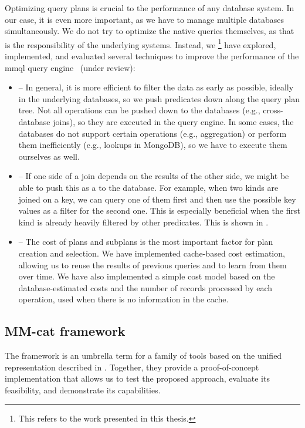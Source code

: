 Optimizing query plans is crucial to the performance of any database system. In our case, it is even more important, as we have to manage multiple databases simultaneously. We do not try to optimize the native queries themselves, as that is the responsibility of the underlying systems. Instead, we%
\footnote{This  refers to the work presented in this thesis.}
have explored, implemented, and evaluated several techniques to improve the performance of the \acrshort{mmql} query engine~\citep{strobl_2026} (under review):
\begin{itemize}
    \item {} -- In general, it is more efficient to filter the data as early as possible, ideally in the underlying databases, so we push predicates down along the query plan tree. Not all operations can be pushed down to the databases (e.g., cross-database joins), so they are executed in the query engine. In some cases, the databases do not support certain operations (e.g., aggregation) or perform them inefficiently (e.g., lookups in MongoDB), so we have to execute them ourselves as well.
    \item {} -- If one side of a join depends on the results of the other side, we might be able to push this as a  to the database. For example, when two kinds are joined on a key, we can query one of them first and then use the possible key values as a filter for the second one. This is especially beneficial when the first kind is already heavily filtered by other predicates. This is shown in .
    \item {} -- The cost of plans and subplans is the most important factor for plan creation and selection. We have implemented cache-based cost estimation, allowing us to reuse the results of previous queries and to learn from them over time. We have also implemented a simple cost model based on the database-estimated costs and the number of records processed by each operation, used when there is no information in the cache.
\end{itemize}

\subsection{MM-cat framework}

The  framework is an umbrella term for a family of tools based on the unified representation described in . Together, they provide a proof-of-concept implementation that allows us to test the proposed approach, evaluate its feasibility, and demonstrate its capabilities.


